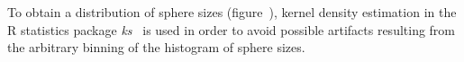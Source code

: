 
To obtain a distribution of sphere sizes (figure~), kernel density estimation in the R
statistics package \emph{ks}~\cite{Duong_2007} is used in order to avoid possible artifacts
resulting from the arbitrary binning of the histogram of sphere sizes. 

